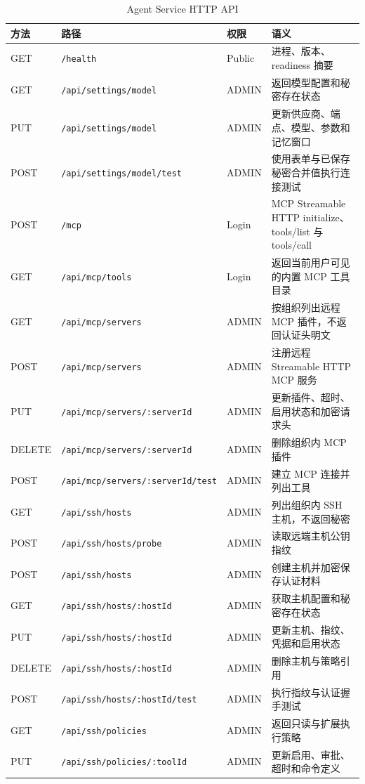 \documentclass[conference,10pt]{IEEEtran}
\newcommand{\code}[1]{\texttt{#1}}
\begin{document}
\begin{table}[htbp]
\caption{Agent Service HTTP API}
\label{tab:appendix-api}
\centering
\scriptsize
\begin{tabularx}{\textwidth}{p{1.6cm}p{5.8cm}p{2.1cm}Y}
\toprule
\textbf{方法} & \textbf{路径} & \textbf{权限} & \textbf{语义} \\
\midrule
GET & \code{/health} & Public & 进程、版本、readiness 摘要 \\
GET & \code{/api/settings/model} & ADMIN & 返回模型配置和秘密存在状态 \\
PUT & \code{/api/settings/model} & ADMIN & 更新供应商、端点、模型、参数和记忆窗口 \\
POST & \code{/api/settings/model/test} & ADMIN & 使用表单与已保存秘密合并值执行连接测试 \\
POST & \code{/mcp} & Login & MCP Streamable HTTP initialize、tools/list 与 tools/call \\
GET & \code{/api/mcp/tools} & Login & 返回当前用户可见的内置 MCP 工具目录 \\
GET & \code{/api/mcp/servers} & ADMIN & 按组织列出远程 MCP 插件，不返回认证头明文 \\
POST & \code{/api/mcp/servers} & ADMIN & 注册远程 Streamable HTTP MCP 服务 \\
PUT & \code{/api/mcp/servers/:serverId} & ADMIN & 更新插件、超时、启用状态和加密请求头 \\
DELETE & \code{/api/mcp/servers/:serverId} & ADMIN & 删除组织内 MCP 插件 \\
POST & \code{/api/mcp/servers/:serverId/test} & ADMIN & 建立 MCP 连接并列出工具 \\
GET & \code{/api/ssh/hosts} & ADMIN & 列出组织内 SSH 主机，不返回秘密 \\
POST & \code{/api/ssh/hosts/probe} & ADMIN & 读取远端主机公钥指纹 \\
POST & \code{/api/ssh/hosts} & ADMIN & 创建主机并加密保存认证材料 \\
GET & \code{/api/ssh/hosts/:hostId} & ADMIN & 获取主机配置和秘密存在状态 \\
PUT & \code{/api/ssh/hosts/:hostId} & ADMIN & 更新主机、指纹、凭据和启用状态 \\
DELETE & \code{/api/ssh/hosts/:hostId} & ADMIN & 删除主机与策略引用 \\
POST & \code{/api/ssh/hosts/:hostId/test} & ADMIN & 执行指纹与认证握手测试 \\
GET & \code{/api/ssh/policies} & ADMIN & 返回只读与扩展执行策略 \\
PUT & \code{/api/ssh/policies/:toolId} & ADMIN & 更新启用、审批、超时和命令定义 \\

\end{tabularx}
\end{table}
\end{document}
